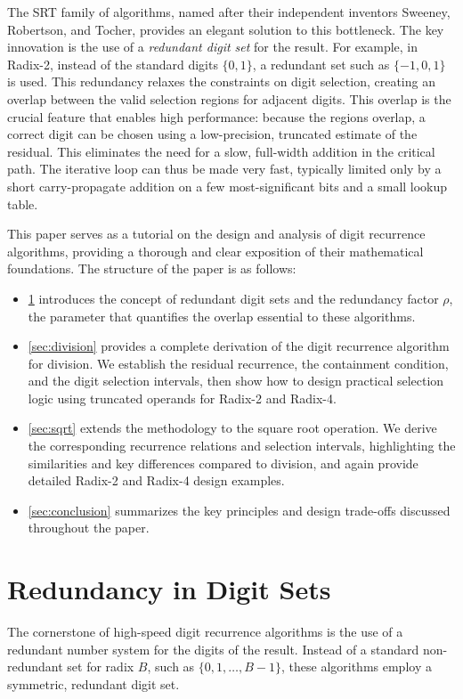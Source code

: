 \documentclass{article}
\begin{document}
The SRT family of algorithms, named after their independent inventors Sweeney, Robertson, and Tocher, provides an elegant solution to this bottleneck.
The key innovation is the use of a \emph{redundant digit set} for the result.
For example, in Radix-2, instead of the standard digits $\{0, 1\}$, a redundant set such as $\{-1, 0, 1\}$ is used.
This redundancy relaxes the constraints on digit selection, creating an overlap between the valid selection regions for adjacent digits.
This overlap is the crucial feature that enables high performance: because the regions overlap, a correct digit can be chosen using a low-precision, truncated estimate of the residual.
This eliminates the need for a slow, full-width addition in the critical path.
The iterative loop can thus be made very fast, typically limited only by a short carry-propagate addition on a few most-significant bits and a small lookup table.

This paper serves as a tutorial on the design and analysis of digit recurrence algorithms, providing a thorough and clear exposition of their mathematical foundations.
The structure of the paper is as follows:
\begin{itemize}
  \item \cref{sec:redundancy} introduces the concept of redundant digit sets and the redundancy factor $\rho$, the parameter that quantifies the overlap essential to these algorithms.
  \item \cref{sec:division} provides a complete derivation of the digit recurrence algorithm for division. We establish the residual recurrence, the containment condition, and the digit selection intervals, then show how to design practical selection logic using truncated operands for Radix-2 and Radix-4.
  \item \cref{sec:sqrt} extends the methodology to the square root operation. We derive the corresponding recurrence relations and selection intervals, highlighting the similarities and key differences compared to division, and again provide detailed Radix-2 and Radix-4 design examples.
  \item \cref{sec:conclusion} summarizes the key principles and design trade-offs discussed throughout the paper.
\end{itemize}

\section{Redundancy in Digit Sets}
\label{sec:redundancy}
The cornerstone of high-speed digit recurrence algorithms is the use of a redundant number system for the digits of the result.
Instead of a standard non-redundant set for radix $B$, such as $\{0, 1, \dots, B-1\}$, these algorithms employ a symmetric, redundant digit set.
\end{document}
